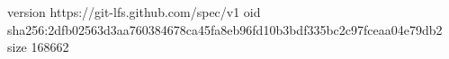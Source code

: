 version https://git-lfs.github.com/spec/v1
oid sha256:2dfb02563d3aa760384678ca45fa8eb96fd10b3bdf335bc2c97fceaa04e79db2
size 168662
